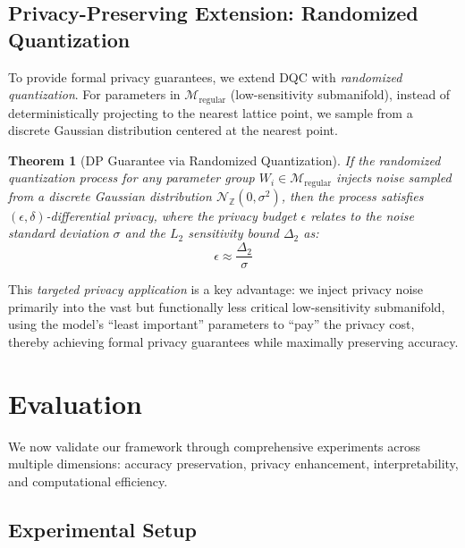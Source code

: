 \documentclass[letterpaper,twocolumn,10pt]{article}
\newtheorem{theorem}{Theorem}
\begin{document}
\subsection{Privacy-Preserving Extension: Randomized Quantization}

To provide formal privacy guarantees, we extend DQC with \emph{randomized quantization}. For parameters in $\mathcal{M}_{\text{regular}}$ (low-sensitivity submanifold), instead of deterministically projecting to the nearest lattice point, we sample from a discrete Gaussian distribution centered at the nearest point.

\begin{theorem}[DP Guarantee via Randomized Quantization]
\label{thm:dp_guarantee}
If the randomized quantization process for any parameter group $W_i \in \mathcal{M}_{\text{regular}}$ injects noise sampled from a discrete Gaussian distribution $\mathcal{N}_{\mathbb{Z}}(0, \sigma^2)$, then the process satisfies $(\epsilon, \delta)$-differential privacy, where the privacy budget $\epsilon$ relates to the noise standard deviation $\sigma$ and the $L_2$ sensitivity bound $\Delta_2$ as:
\begin{equation}
\epsilon \approx \frac{\Delta_2}{\sigma}
\end{equation}
\end{theorem}

This \emph{targeted privacy application} is a key advantage: we inject privacy noise primarily into the vast but functionally less critical low-sensitivity submanifold, using the model's ``least important'' parameters to ``pay'' the privacy cost, thereby achieving formal privacy guarantees while maximally preserving accuracy.

\section{Evaluation}
\label{sec:evaluation}

We now validate our framework through comprehensive experiments across multiple dimensions: accuracy preservation, privacy enhancement, interpretability, and computational efficiency.

\subsection{Experimental Setup}
\end{document}
